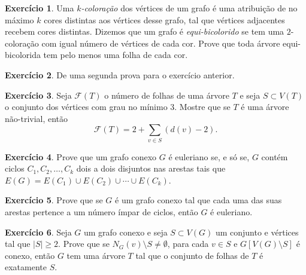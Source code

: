 \documentclass[11pt]{amsart}
\theoremstyle{plain}
\theoremstyle{definition}
\newtheorem{exercise}{Exercício}
\begin{document}
\begin{exercise}
  Uma \textit{$k$-coloração} dos vértices de um grafo é uma atribuição de no máximo $k$
  cores distintas aos vértices desse grafo, tal que vértices adjacentes recebem
  cores distintas. Dizemos que um grafo é \textit{equi-bicolorido} se tem uma
  $2$-coloração com igual número de vértices de cada cor.
  Prove que toda árvore equi-bicolorida tem pelo menos uma folha de cada cor.
\end{exercise}

\begin{exercise}
  De uma segunda prova para o exercício anterior.
\end{exercise}

\begin{exercise}
  Seja $\mathcal{F}(T)$ o número de folhas de uma árvore $T$ e seja $S \subset
  V(T)$ o conjunto dos vértices com grau no mínimo 3. Mostre que se $T$
  é uma árvore não-trivial, então \[
    \mathcal{F}(T) = 2 + \sum_{v \in S} \left( d(v) - 2 \right)
  .\]
\end{exercise}

\begin{exercise}
  Prove que um grafo conexo $G$ é euleriano se, e só se, $G$ contém ciclos
  $C_{1},C_{2},\ldots,C_{k}$ dois a dois disjuntos nas arestas tais que $E(G) =
  E(C_{1}) \cup E(C_{2}) \cup \cdots \cup E(C_{k})$.
\end{exercise}

\begin{exercise}
  Prove que se $G$ é um grafo conexo tal que cada uma das suas arestas pertence
  a um número ímpar de ciclos, então $G$ é euleriano.
\end{exercise}

\begin{exercise}
    Seja $G$ um grafo conexo e seja $S\subset V(G)$ um conjunto e vértices tal que $|S|\geq 2$. Prove que se $N_G(v)\setminus S\neq \emptyset$, para cada $v\in S$ e $G[V(G)\setminus S]$ é conexo, então $G$ tem uma árvore $T$ tal que o conjunto de folhas de $T$ é exatamente $S$.
\end{exercise}
\end{document}
